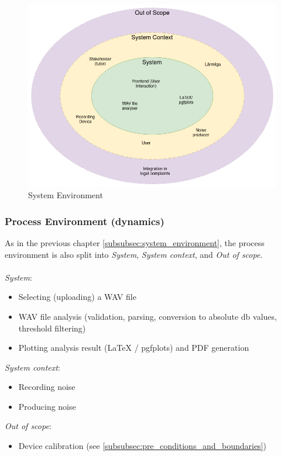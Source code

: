 \begin{figure}[H]
    \centering
    \includegraphics[width=1\textwidth]{../assets/system_environment.png}
    \caption{System Environment}\label{fig:system-environment}
\end{figure}

\subsubsection{Process Environment (dynamics)}\label{subsubsec:process_environment}
As in the previous chapter \ref{subsubsec:system_environment}, the process environment is also split into \textit{System}, \textit{System context}, and \textit{Out of scope}. \\~\\
\textit{System}:
\begin{itemize}
    \item Selecting (uploading) a WAV file
    \item WAV file analysis (validation, parsing, conversion to absolute db values, threshold filtering)
    \item Plotting analysis result (LaTeX / pgfplots) and PDF generation
\end{itemize}
\textit{System context}:
\begin{itemize}
    \item Recording noise
    \item Producing noise
\end{itemize}
\textit{Out of scope}:
\begin{itemize}
    \item Device calibration (see \ref{subsubsec:pre_conditions_and_boundaries})
\end{itemize}

